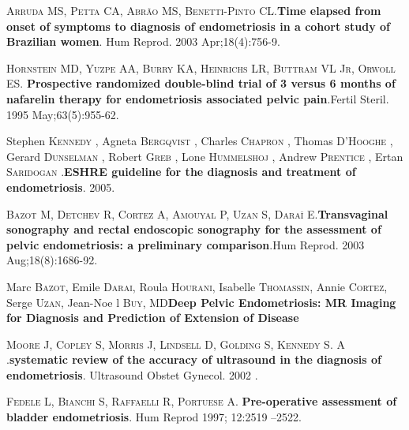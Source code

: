 \documentclass[12pt]{article} %
\begin{document}
\textsc{Arruda MS, Petta CA, Abrão MS, Benetti-Pinto CL}.\textbf{Time elapsed from onset of symptoms to diagnosis of endometriosis in a cohort study of Brazilian women}. Hum Reprod. 2003 Apr;18(4):756-9.

\vspace{0,5cm}

\textsc{Hornstein MD, Yuzpe AA, Burry KA, Heinrichs LR, Buttram VL Jr, Orwoll ES}. \textbf{Prospective randomized double-blind trial of 3 versus 6 months of nafarelin therapy for endometriosis associated pelvic pain}.Fertil Steril. 1995 May;63(5):955-62.

\vspace{0,5cm}

Stephen\textsc{ Kennedy} , Agneta\textsc{ Bergqvist}  , Charles \textsc{Chapron}  , Thomas\textsc{ D’Hooghe}  , Gerard\textsc{ Dunselman}  , Robert\textsc{ Greb}  , Lone\textsc{ Hummelshoj}  , Andrew \textsc{Prentice}  , Ertan\textsc{ Saridogan} .\textbf{ESHRE guideline for the diagnosis and treatment of endometriosis}. 2005.

\vspace{0,5cm}

\textsc{Bazot M, Detchev R, Cortez A, Amouyal P, Uzan S, Daraï E}.\textbf{Transvaginal sonography and rectal endoscopic sonography for the assessment of pelvic endometriosis: a preliminary comparison}.Hum Reprod. 2003 Aug;18(8):1686-92.

\vspace{0,5cm}

Marc\textsc{ Bazot}, Emile \textsc{Darai}, Roula\textsc{ Hourani}, Isabelle \textsc{Thomassin}, Annie\textsc{ Cortez}, Serge\textsc{ Uzan}, 
Jean-Noe l\textsc{ Buy}, MD\textbf{Deep Pelvic Endometriosis: MR Imaging for Diagnosis and Prediction of Extension of Disease }

\vspace{0,5cm}


\textsc{Moore J, Copley S, Morris J, Lindsell D, Golding S, Kennedy S. A} .\textbf{systematic review of the accuracy of ultrasound in the diagnosis of endometriosis}. Ultrasound Obstet Gynecol. 2002 .

\vspace{0,5cm}

\textsc{Fedele L, Bianchi S, Raffaelli R, Portuese A}. \textbf{Pre-operative assessment of bladder endometriosis}. Hum Reprod 1997; 12:2519 –2522.

\vspace{0,5cm}
\end{document}
